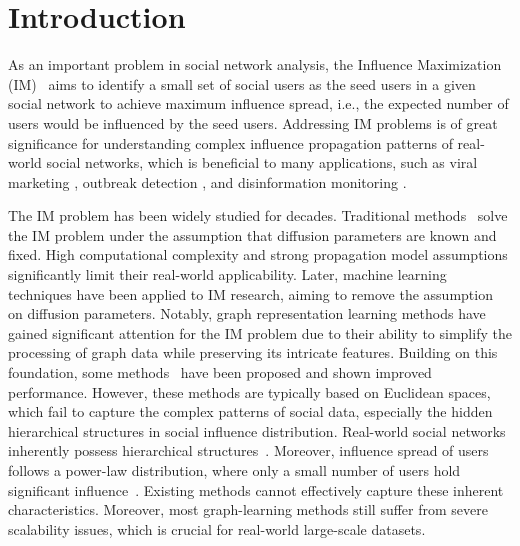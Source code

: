 \section{Introduction}

As an important problem in social network analysis, the Influence Maximization (IM)~\cite{kempe2003im, TKDE18_li2018influence_survey, lihui2023_influence_survey, TKDD23_li2023survey} aims to identify a small set of social users as the seed users in a given social network to achieve maximum influence spread, i.e., the expected number of users would be influenced by the seed users. 
Addressing IM problems is of great significance for understanding complex influence propagation patterns of real-world social networks, which is beneficial to many applications, such as viral marketing \cite{nguyen2016SSA, AAAI2018_tang}, outbreak detection \cite{leskovec2007CELF, AAAI2024_neophytou}, and disinformation monitoring \cite{budak2011limiting, sharma2021network}.


The IM problem has been widely studied for decades. 
Traditional methods~\cite{kempe2003im, leskovec2007CELF, tang2015IMM, wang2016BKRIS} solve the IM problem under the assumption that diffusion parameters are known and fixed.
High computational complexity and strong propagation model assumptions significantly limit their real-world applicability.
Later, machine learning techniques have been applied to IM research, aiming to remove the assumption on diffusion parameters.
Notably, graph representation learning methods have gained significant attention for the IM problem due to their ability to simplify the processing of graph data while preserving its intricate features.
Building on this foundation, some methods~\cite{kumar2022gnn, zhang2022GCNM, li2022piano, chen2023ToupleGDD, ling2023icml, hevapathige2024_DeepSN} have been proposed and shown improved performance. 
However, these methods are typically based on Euclidean spaces, which fail to capture the complex patterns of social data, especially the hidden hierarchical structures in social influence distribution. Real-world social networks inherently possess hierarchical structures~\cite{barabasi1999emergence}.
Moreover, influence spread of users follows a power-law distribution, where only a small number of users hold significant influence~\cite{verbeek2014metric}.
Existing methods cannot effectively capture these inherent characteristics. Moreover, most graph-learning methods still suffer from severe scalability issues, which is crucial for real-world large-scale datasets.

